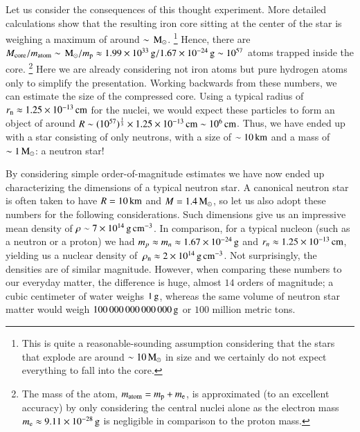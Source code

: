 Let us consider the consequences of this thought experiment.
More detailed calculations show that the resulting iron core sitting at the center of the star is weighing a maximum of around $\sim \, \mathrm{M}_{\odot}$.%
\footnote{This is quite a reasonable-sounding assumption considering that the stars that explode are around $\sim10\, \mathrm{M}_{\odot}$ in size and we certainly do not expect everything to fall into the core.
}
Hence, there are $M_{\mathrm{core}} / m_{\mathrm{atom}} \sim \, \mathrm{M}_{\odot} / m_{\mathrm{p}} \approx 1.99 \times 10^{33} \, \mathrm{g} / 1.67 \times 10^{-24} \, \mathrm{g} \sim 10^{57}$ atoms trapped inside the core.
\footnote{
    The mass of the atom, $m_{\mathrm{atom}} = m_{\mathrm{p}} + m_{\mathrm{e}}$, is approximated (to an excellent accuracy) by only considering the central nuclei alone as the electron mass $m_{\mathrm{e}} \approx 9.11 \times 10^{-28} \, \mathrm{g}$ is negligible in comparison to the proton mass.
}
Here we are already considering not iron atoms but pure hydrogen atoms only to simplify the presentation.
Working backwards from these numbers, we can estimate the size of the compressed core.
Using a typical radius of $r_{\mathrm{n}} \approx 1.25 \times 10^{-13}\, \mathrm{cm}$ for the nuclei, we would expect these particles to form an object of around $R \sim (10^{57})^{\frac{1}{3}} \times 1.25 \times 10^{-13}\, \mathrm{cm} \sim 10^6 \, \mathrm{cm}$. Thus, we have ended up with a star consisting of only neutrons, with a size of $\sim 10\, \mathrm{km}$ and a mass of $\sim 1\, \mathrm{M}_{\odot}$: a neutron star!

By considering simple order-of-magnitude estimates we have now ended up characterizing the dimensions of a typical neutron star.
A canonical neutron star is often taken to have $R=10\, \mathrm{km}$ and $M=1.4\, \mathrm{M}_{\odot}$, so let us also adopt these numbers for the following considerations.
Such dimensions give us an impressive mean density of $\rho \sim 7 \times 10^{14} \, \mathrm{g}\,\mathrm{cm}^{-3}$.
In comparison, for a typical nucleon (such as a neutron or a proton) we had $m_{p} \approx m_{n} \approx 1.67 \times 10^{-24} \, \mathrm{g}$ and $r_{n} \approx 1.25 \times 10^{-13} \, \mathrm{cm}$, yielding us a nuclear density of $\, \rho_{\mathrm{n}}  \approx 2 \times 10^{14} \, \mathrm{g}\,\mathrm{cm}^{-3}$.
Not surprisingly, the densities are of similar magnitude.
However, when comparing these numbers to our everyday matter, the difference is huge, almost $14$ orders of magnitude;
a cubic centimeter of water weighs $1\, \mathrm{g}$, whereas the same volume of neutron star matter would weigh $100\,000\,000\,000\,000\, \mathrm{g}$ or $100$ million metric tons.


